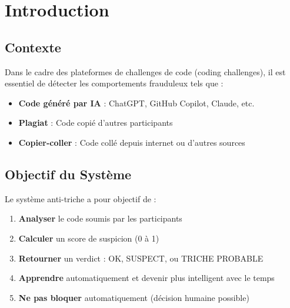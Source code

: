 \documentclass[12pt,a4paper]{report}
\begin{document}
\tableofcontents
\newpage

\chapter{Introduction}

\section{Contexte}

Dans le cadre des plateformes de challenges de code (coding challenges), il est essentiel de détecter les comportements frauduleux tels que :

\begin{itemize}[leftmargin=2cm]
    \item[\textbf{1.}] \textbf{Code généré par IA} : ChatGPT, GitHub Copilot, Claude, etc.
    \item[\textbf{2.}] \textbf{Plagiat} : Code copié d'autres participants
    \item[\textbf{3.}] \textbf{Copier-coller} : Code collé depuis internet ou d'autres sources
\end{itemize}

\section{Objectif du Système}

Le système anti-triche a pour objectif de :

\begin{successbox}
\begin{enumerate}
    \item \textbf{Analyser} le code soumis par les participants
    \item \textbf{Calculer} un score de suspicion (0 à 1)
    \item \textbf{Retourner} un verdict : OK, SUSPECT, ou TRICHE PROBABLE
    \item \textbf{Apprendre} automatiquement et devenir plus intelligent avec le temps
    \item \textbf{Ne pas bloquer} automatiquement (décision humaine possible)
\end{enumerate}
\end{successbox}
\end{document}
